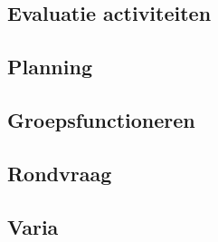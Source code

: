 \documentclass[a4paper,kulak]{kulakarticle} %
\begin{document}
\subsection{Evaluatie activiteiten}

\subsection{Planning}

\subsection{Groepsfunctioneren}

\subsection{Rondvraag}

\subsection{Varia}
\end{document}
